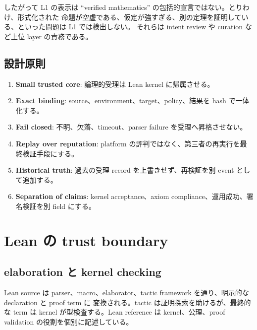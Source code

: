 \documentclass[a4paper,11pt]{ltjsarticle}
\newcommand{\term}[1]{\textbf{\color{TFNavy}#1}}
\begin{document}
したがって L1 の表示は ``verified mathematics'' の包括的宣言ではない。とりわけ、形式化された
命題が空虚である、仮定が強すぎる、別の定理を証明している、といった問題は L1 では検出しない。
それらは intent review や curation など上位 layer の責務である。

\subsection{設計原則}

\begin{enumerate}
  \item \term{Small trusted core}: 論理的受理は Lean kernel に帰属させる。
  \item \term{Exact binding}: source、environment、target、policy、結果を hash で一体化する。
  \item \term{Fail closed}: 不明、欠落、timeout、parser failure を受理へ昇格させない。
  \item \term{Replay over reputation}: platform の評判ではなく、第三者の再実行を最終検証手段にする。
  \item \term{Historical truth}: 過去の受理 record を上書きせず、再検証を別 event として追加する。
  \item \term{Separation of claims}: kernel acceptance、axiom compliance、運用成功、署名検証を別 field にする。
\end{enumerate}

\section{Lean の trust boundary}

\subsection{elaboration と kernel checking}

Lean source は parser、macro、elaborator、tactic framework を通り、明示的な declaration と proof term に
変換される。tactic は証明探索を助けるが、最終的な term は kernel が型検査する。Lean reference は
kernel、公理、proof validation の役割を個別に記述している\cite{leanref,leankernel,leanaxioms,leanvalidate}。
\end{document}
